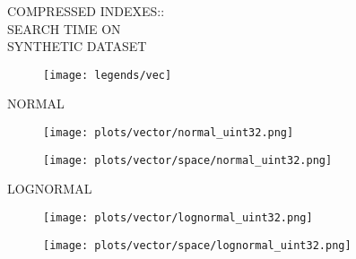 \documentclass{article}
\begin{document}
\begin{figure}[!htbp]
\fbox
{
\begin{minipage}[t][0.98\textheight][t]{\textwidth}
\centering
\vspace*{-0.2cm}
\begin{minipage}{0.23\linewidth}
    \footnotesize{COMPRESSED INDEXES::\\SEARCH TIME ON \\ SYNTHETIC DATASET}
    \end{minipage}
   \begin{minipage}{0.75\linewidth}
        \begin{figure}[H]
        \texttt{[image: legends/vec]}
        \end{figure}
    \end{minipage}

    \begin{minipage}{0.03\linewidth}
    \begin{sideways}\small NORMAL\end{sideways}
    \end{minipage}
    \begin{minipage}{0.3\linewidth}
        \begin{figure}[H]
        \texttt{[image: plots/vector/normal\_uint32.png]}
        \end{figure}
    \end{minipage}
    \begin{minipage}{0.3\linewidth}
        \begin{figure}[H]
            \texttt{[image: plots/vector/space/normal\_uint32.png]}
        \end{figure}
    \end{minipage}
    \vspace*{-20px}

    \begin{minipage}{0.03\linewidth}
    \begin{sideways}\small LOGNORMAL\end{sideways}
    \end{minipage}
    \begin{minipage}{0.3\linewidth}
        \begin{figure}[H]
        \texttt{[image: plots/vector/lognormal\_uint32.png]}
        \end{figure}
    \end{minipage}
    \begin{minipage}{0.3\linewidth}
        \begin{figure}[H]
            \texttt{[image: plots/vector/space/lognormal\_uint32.png]}
        \end{figure}
    \end{minipage}
    \vspace*{-20px}


\end{minipage}}
\end{figure}
\end{document}

